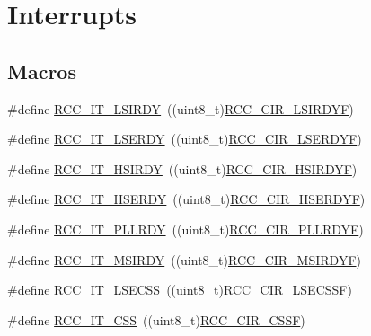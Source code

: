 \hypertarget{group___r_c_c___interrupt}{\section{Interrupts}
\label{group___r_c_c___interrupt}
}
\subsection*{Macros}
\begin{DoxyCompactItemize}
\item 
\#define \hyperlink{group___r_c_c___interrupt_ga2b4ef277c1b71f96e0bef4b9a72fca94}{R\-C\-C\-\_\-\-I\-T\-\_\-\-L\-S\-I\-R\-D\-Y}~((uint8\-\_\-t)\hyperlink{group___peripheral___registers___bits___definition_gacb94ccfe6a212f020e732d1dd787a6fb}{R\-C\-C\-\_\-\-C\-I\-R\-\_\-\-L\-S\-I\-R\-D\-Y\-F})
\item 
\#define \hyperlink{group___r_c_c___interrupt_gad6b6e78a426850f595ef180d292a673d}{R\-C\-C\-\_\-\-I\-T\-\_\-\-L\-S\-E\-R\-D\-Y}~((uint8\-\_\-t)\hyperlink{group___peripheral___registers___bits___definition_gabfc100e7ae673dfcec7be79af0d91dfe}{R\-C\-C\-\_\-\-C\-I\-R\-\_\-\-L\-S\-E\-R\-D\-Y\-F})
\item 
\#define \hyperlink{group___r_c_c___interrupt_ga69637e51b71f73f519c8c0a0613d042f}{R\-C\-C\-\_\-\-I\-T\-\_\-\-H\-S\-I\-R\-D\-Y}~((uint8\-\_\-t)\hyperlink{group___peripheral___registers___bits___definition_gad38877547c4cbbb94659d5726f377163}{R\-C\-C\-\_\-\-C\-I\-R\-\_\-\-H\-S\-I\-R\-D\-Y\-F})
\item 
\#define \hyperlink{group___r_c_c___interrupt_gad13eaede352bca59611e6cae68665866}{R\-C\-C\-\_\-\-I\-T\-\_\-\-H\-S\-E\-R\-D\-Y}~((uint8\-\_\-t)\hyperlink{group___peripheral___registers___bits___definition_ga11ea196450aac9ac35e283a66afc3da6}{R\-C\-C\-\_\-\-C\-I\-R\-\_\-\-H\-S\-E\-R\-D\-Y\-F})
\item 
\#define \hyperlink{group___r_c_c___interrupt_ga68d48e7811fb58f2649dce6cf0d823d9}{R\-C\-C\-\_\-\-I\-T\-\_\-\-P\-L\-L\-R\-D\-Y}~((uint8\-\_\-t)\hyperlink{group___peripheral___registers___bits___definition_ga0f007895a17e668f22f7b8b24ca90aec}{R\-C\-C\-\_\-\-C\-I\-R\-\_\-\-P\-L\-L\-R\-D\-Y\-F})
\item 
\#define \hyperlink{group___r_c_c___interrupt_gae0cfda620ac8949e5b266661dba7ba0a}{R\-C\-C\-\_\-\-I\-T\-\_\-\-M\-S\-I\-R\-D\-Y}~((uint8\-\_\-t)\hyperlink{group___peripheral___registers___bits___definition_ga3730ae0a55c59ca7581ae1e8e8319663}{R\-C\-C\-\_\-\-C\-I\-R\-\_\-\-M\-S\-I\-R\-D\-Y\-F})
\item 
\#define \hyperlink{group___r_c_c___interrupt_gaf3f259914cb56820b1649c9d4413736c}{R\-C\-C\-\_\-\-I\-T\-\_\-\-L\-S\-E\-C\-S\-S}~((uint8\-\_\-t)\hyperlink{group___peripheral___registers___bits___definition_ga84414a22392ea3454741ac25f2d68773}{R\-C\-C\-\_\-\-C\-I\-R\-\_\-\-L\-S\-E\-C\-S\-S\-F})
\item 
\#define \hyperlink{group___r_c_c___interrupt_ga9bb34a4912d2084dc1c0834eb53aa7a3}{R\-C\-C\-\_\-\-I\-T\-\_\-\-C\-S\-S}~((uint8\-\_\-t)\hyperlink{group___peripheral___registers___bits___definition_gad66b719e4061294de35af58cc27aba7f}{R\-C\-C\-\_\-\-C\-I\-R\-\_\-\-C\-S\-S\-F})
\end{DoxyCompactItemize}


